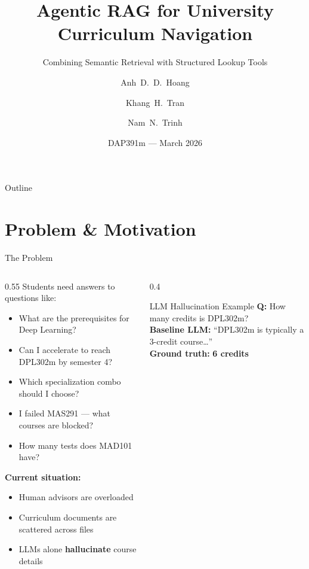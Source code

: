 \documentclass[aspectratio=169,10pt]{beamer}
\title[Agentic RAG for Curriculum Navigation]{Agentic RAG for University\\Curriculum Navigation}
\subtitle{Combining Semantic Retrieval with Structured Lookup Tools}
\author[Hoang et al.]{Anh~D.~D.~Hoang \and Khang~H.~Tran \and Nam~N.~Trinh}
\institute[FPT University]{Information Technology Specialization\\FPT University, Hanoi}
\date{DAP391m --- March 2026}
\begin{document}
\begin{frame}
\titlepage
\end{frame}


\begin{frame}{Outline}
\tableofcontents
\end{frame}


\section{Problem \& Motivation}

\begin{frame}{The Problem}

\begin{columns}[T]
\begin{column}{0.55\textwidth}
Students need answers to questions like:
\begin{itemize}
    \item What are the prerequisites for Deep Learning?
    \item Can I accelerate to reach DPL302m by semester 4?
    \item Which specialization combo should I choose?
    \item I failed MAS291 --- what courses are blocked?
    \item How many tests does MAD101 have?
\end{itemize}

\vspace{0.5em}
\textbf{Current situation:}
\begin{itemize}
    \item Human advisors are overloaded
    \item Curriculum documents are scattered across files
    \item LLMs alone \textbf{hallucinate} course details
\end{itemize}
\end{column}

\begin{column}{0.4\textwidth}
\begin{alertblock}{LLM Hallucination Example}
\footnotesize
\textbf{Q:} How many credits is DPL302m?\\[0.3em]
\textbf{Baseline LLM:} ``DPL302m is typically a 3-credit course\ldots''\\[0.3em]
\textbf{Ground truth:} \textbf{6 credits}
\end{alertblock}
\end{column}
\end{columns}

\end{frame}
\end{document}
